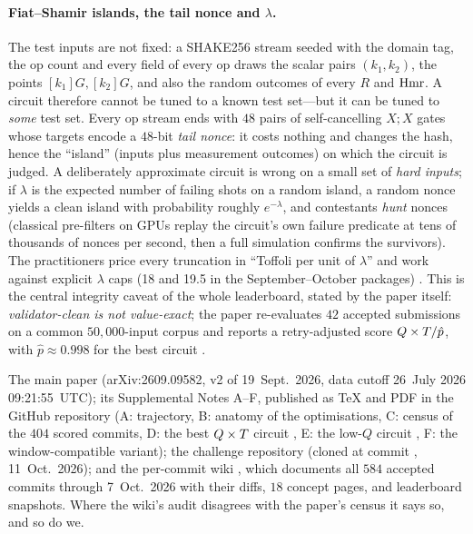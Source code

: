 \paragraph{Fiat--Shamir islands, the tail nonce and $\lambda$.} The test inputs are not fixed: a SHAKE256 stream seeded with the domain tag, the op count and every field of every op draws the scalar pairs $(k_1,k_2)$, the points $[k_1]G,[k_2]G$, and also the random outcomes of every $R$ and $\mathrm{Hmr}$. A circuit therefore cannot be tuned to a known test set---but it can be tuned to \emph{some} test set. Every op stream ends with $48$ pairs of self-cancelling $X;X$ gates whose targets encode a $48$-bit \emph{tail nonce}: it costs nothing and changes the hash, hence the ``island'' (inputs plus measurement outcomes) on which the circuit is judged. A deliberately approximate circuit is wrong on a small set of \emph{hard inputs}; if $\lambda$ is the expected number of failing shots on a random island, a random nonce yields a clean island with probability roughly $e^{-\lambda}$, and contestants \emph{hunt} nonces (classical pre-filters on GPUs replay the circuit's own failure predicate at tens of thousands of nonces per second, then a full simulation confirms the survivors). The practitioners price every truncation in ``Toffoli per unit of $\lambda$'' and work against explicit $\lambda$ caps (18 and 19.5 in the September--October packages) \cite{ecdsafail-wiki}. This is the central integrity caveat of the whole leaderboard, stated by the paper itself: \emph{validator-clean is not value-exact}; the paper re-evaluates $42$ accepted submissions on a common $50{,}000$-input corpus and reports a retry-adjusted score $Q\times T/\hat p$, with $\hat p\approx0.998$ for the best circuit \cite{ecdsafail26}.

\begin{srcbox}[title={Where the material in Part~I comes from}]
The main paper \cite{ecdsafail26} (arXiv:2609.09582, v2 of 19~Sept.\ 2026, data cutoff 26~July 2026 09:21:55~UTC); its Supplemental Notes A--F, published as TeX and PDF in the GitHub repository  \cite{ecdsafail-supp} (A: trajectory, B: anatomy of the optimisations, C: census of the $404$ scored commits, D: the best $Q\times T$ circuit , E: the low-$Q$ circuit , F: the window-compatible variant); the challenge repository  \cite{ecdsafail-repo} (cloned at commit , 11~Oct.\ 2026); and the per-commit wiki  \cite{ecdsafail-wiki}, which documents all $584$ accepted commits through 7~Oct.\ 2026 with their diffs, $18$ concept pages, and leaderboard snapshots. Where the wiki's audit disagrees with the paper's census it says so, and so do we.
\end{srcbox}
